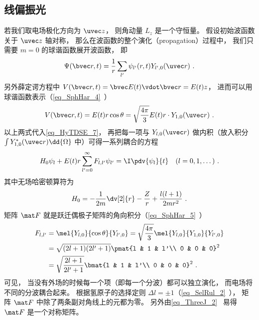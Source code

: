 \subsection{线偏振光}
若我们取电场极化方向为 $\uvec z$， 则角动量 $L_z$ 是一个守恒量。 假设初始波函数关于 $\uvec z$ 轴对称， 那么在波函数的整个演化（propagation）过程中， 我们只需要 $m=0$ 的球谐函数展开波函数， 即
\begin{equation}
\Psi(\bvec r, t) = \frac{1}{r}\sum_{l'} \psi_{l'}(r, t) Y_{l', 0}(\uvec r)~.
\end{equation}
另外薛定谔方程中 $V(\bvec r, t) = \bvec E(t) \vdot \bvec r = E(t) z$， 进而可以用球谐函数表示（\autoref{eq_SphHar_4}~）
\begin{equation}
V(\bvec r, t) = E(t) r \cos\theta = \sqrt{\frac{4\pi}{3}} E(t) r \cdot Y_{1,0}(\uvec r)~.
\end{equation}
以上两式代入\autoref{eq_HyTDSE_7}， 再把每一项与 $Y_{l,0}(\uvec r)$ 做内积（放入积分 $\int Y_{1,0}^*(\uvec r) \dd{\Omega}$ 中）可得一系列耦合的方程
\begin{equation}\label{eq_HyTDSE_4}
H_0 \psi_{l} + E(t)r\sum_{l' = 0}^{\infty} F_{l, l'} \psi_{l'} = \I \pdv{\psi_{l}}{t} \quad (l=0,1,\dots)~.
\end{equation}
其中无场哈密顿算符为
\begin{equation}
H_0 = -\frac{1}{2m} \dv[2]{r} -\frac{Z}{r} + \frac{l(l+1)}{2mr^2}~.
\end{equation}
矩阵 $\mat F$ 就是跃迁偶极子矩阵的角向积分（\autoref{eq_SphHar_5}~）
\begin{equation}
\begin{aligned}
F_{l,l'} &= \mel{Y_{l,0}}{\cos\theta}{Y_{l',0}} = \sqrt{\frac{4\pi}{3}} \mel{Y_{l,0}}{Y_{1,0}}{Y_{l',0}}\\
&= \sqrt{(2l+1)(2l'+1)} \pmat{l & 1 & l'\\ 0 & 0 & 0}^2\\
&= \sqrt{\frac{2l+1}{2l'+1}} \bmat{l & 1 & l'\\ 0 & 0 & 0}^2~.
\end{aligned}
\end{equation}
可见， 当没有外场的时候每一个项（即每一个分波）都可以独立演化， 而电场将不同的分波耦合起来。 根据氢原子的选择定则 $\Delta l = \pm 1$（\autoref{eq_SelRul_2}~）， 矩阵 $\mat F$ 中除了两条副对角线上的元都为零。 另外由\autoref{eq_ThreeJ_2}~ 易得 $\mat F$ 是一个对称矩阵。

